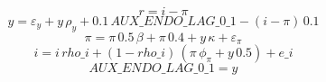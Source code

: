 \begin{dmath*}
r = {i}-{\pi}
\end{dmath*}
\begin{dmath}
{y}={\varepsilon_y}+{y}\, {\rho_y}+0.1\, {AUX\_ENDO\_LAG\_0\_1}-\left({i}-{\pi}\right)\, 0.1
\end{dmath}
\begin{dmath}
{\pi}={\pi}\, 0.5\, {\beta}+{\pi}\, 0.4+{y}\, {\kappa}+{\varepsilon_\pi}
\end{dmath}
\begin{dmath}
{i}={i}\, {rho\_i}+\left(1-{rho\_i}\right)\, \left({\pi}\, {\phi_\pi}+{y}\, 0.5\right)+{e\_i}
\end{dmath}
\begin{dmath}
{AUX\_ENDO\_LAG\_0\_1}={y}
\end{dmath}
